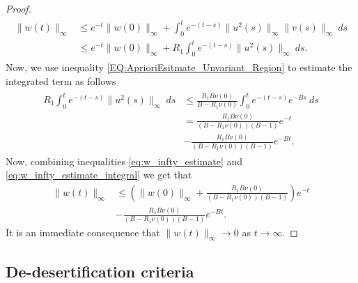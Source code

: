 \documentclass[12pt, a4paper]{article}
\theoremstyle{break}
\theoremstyle{break}
\theoremstyle{break}
\theoremstyle{break}
\theoremstyle{break}
\theoremstyle{break}
\theoremstyle{break}
\begin{document}
\begin{proof}
\begin{align}
        \label{eq:w_infty_estimate}
        \begin{split}
            \|w(t)\|_\infty 
            &\leq e^{-t}\|w(0)\|_\infty + \int_0^t e^{-(t-s)} \|u^2(s)\|_\infty \|v(s)\|_\infty\:ds \\
            &\leq e^{-t}\|w(0)\|_\infty + R_1\int_0^t e^{-(t-s)} \|u^2(s)\|_\infty \:ds.
        \end{split}
    \end{align}
    Now, we use inequality \eqref{EQ:AprioriEsitmate_Unvariant_Region} to estimate the integrated term as follows
    \begin{align}
        \label{eq:w_infty_estimate_integral}
        \begin{split}
            R_1 \int_0^t e^{-(t-s)} \|u^2(s)\|_\infty \:ds 
            &\leq
            \frac{R_1 B \nu(0)}{B-R_1 \nu(0)} \int_0^t e^{-(t-s)} e^{-Bs}\:ds \\
            &= 
            \frac{R_1 B \nu(0)}{(B-R_1\nu(0))(B-1)} e^{-t} \\
            &- 
            \frac{R_1 B \nu(0)}{(B-R_1\nu(0))(B-1)} e^{-Bt}.
        \end{split}
    \end{align}
    Now, combining inequalities \eqref{eq:w_infty_estimate} and \eqref{eq:w_infty_estimate_integral} we get that
    \begin{align*}
        \|w(t)\|_\infty 
        &\leq \left( \|w(0)\|_\infty + \frac{R_1 B \nu(0)}{(B-R_1\nu(0))(B-1)} \right) e^{-t} \\
        &- \frac{R_1 B \nu(0)}{(B-R_1\nu(0))(B-1)} e^{-Bt}.
    \end{align*}
    It is an immediate consequence that $\|w(t)\|_\infty \rightarrow 0$ as $t \rightarrow \infty$.
\end{proof}

\subsection{De-desertification criteria}
\end{document}
